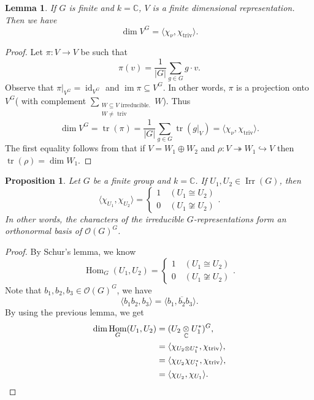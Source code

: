 \documentclass[10pt]{article}
\newtheorem{proposition}{Proposition}[section]
\newtheorem{lemma}{Lemma}[section]
\numberwithin{equation}{theorem}
\DeclareMathOperator{\triv}{triv}
\DeclareMathOperator{\tr}{tr}
\DeclareMathOperator{\Irr}{Irr}
\DeclareMathOperator{\Hom}{Hom}
\DeclareMathOperator{\Image}{im}
\DeclareMathOperator{\id}{id}
\newcommand{\Ouv}[0]{\mathcal{O}}
\newcommand{\C}[0]{\mathbb{C}}
\newcommand{\card}[1]{\vert #1\vert}
\newcommand{\tens}[1]{%
  \mathbin{\mathop{\otimes}\displaylimits_{#1}}%
}
\begin{document}
\begin{lemma}
  If $G$ is finite and $k=\C$, $V$ is a finite dimensional representation. Then we have 
  \begin{equation*}
    \dim V^G = \langle \chi_\nu,\chi_{\triv}\rangle.
  \end{equation*}
\end{lemma}
\begin{proof}
  Let $\pi:V\to V$ be such that 
  \begin{equation*}
    \pi(v) = {\frac 1 {\vert G\vert}}\sum_{g\in G}g\cdot v.
  \end{equation*}
  Observe that $\pi|_{V^G} = \id_{V^G}$ and $\Image\pi\subseteq V^G$. In other words, $\pi$ is a projection onto $V^G$( with complement $\sum_{\substack{W\subseteq V\text{ irreducible.}\\ W\not=\triv}} W$). Thus 
  \begin{equation*}
    \dim V^G = \tr(\pi) = {\frac 1 {\card{G}}}\sum_{g\in G}\tr(g|_V) = \langle\chi_\nu,\chi_{\triv}\rangle.
  \end{equation*}
  The first equality follows from that if $V=W_1\oplus W_2$ and $\rho:V\twoheadrightarrow W_1\hookrightarrow V$ then $\tr(\rho) = \dim W_1$.
\end{proof}
\begin{proposition}
  Let $G$ be a finite group and $k=\C$. If $U_1,U_2\in\Irr(G)$, then 
  \begin{equation*}
    \langle \chi_{U_1},\chi_{U_2}\rangle = \begin{cases}
      1\quad (U_1\cong U_2)\\
      0\quad (U_1\not\cong U_2)
    \end{cases}.
  \end{equation*}
  In other words, the characters of the irreducible $G$-representations form an orthonormal basis of $\Ouv(G)^G$.
\end{proposition}
\begin{proof}
  By Schur's lemma, we know 
  \begin{equation*}
    \Hom_G(U_1,U_2) = \begin{cases}
      1\quad (U_1\cong U_2)\\
      0\quad (U_1\not\cong U_2)
    \end{cases}.
  \end{equation*}
  Note that $b_1,b_2,b_3\in\Ouv(G)^G$, we have 
  \begin{equation*}
    \langle b_1b_2,b_3\rangle = \langle b_1,\overline{b_2}b_3\rangle.
  \end{equation*}
  By using the previous lemma, we get 
  \begin{align*}
    \dim\Hom_G(U_1,U_2) & = (U_2\tens{\C}U_1^*)^G,\\
    & = \langle\chi_{U_2\otimes U_1^*},\chi_{\triv}\rangle,\\
    & = \langle \chi_{U_2}\chi_{U_1^*},\chi_{\triv}\rangle,\\
    & = \langle \chi_{U_2},\chi_{U_1}\rangle.
  \end{align*}
\end{proof}
\end{document}
